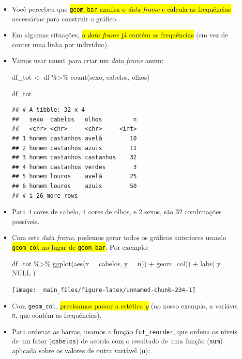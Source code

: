 \documentclass[
  11pt]{report}
\newenvironment{Shaded}{\begin{snugshade}}{\end{snugshade}}
\newcommand{\AttributeTok}[1]{\textcolor[rgb]{0.77,0.63,0.00}{#1}}
\newcommand{\ConstantTok}[1]{\textcolor[rgb]{0.00,0.00,0.00}{#1}}
\newcommand{\FunctionTok}[1]{\textcolor[rgb]{0.00,0.00,0.00}{#1}}
\newcommand{\NormalTok}[1]{#1}
\newcommand{\OtherTok}[1]{\textcolor[rgb]{0.56,0.35,0.01}{#1}}
\newcommand{\SpecialCharTok}[1]{\textcolor[rgb]{0.00,0.00,0.00}{#1}}
\renewenvironment{Shaded}{
    \begin{mdframed}[%
      roundcorner=2pt,%
      innerleftmargin=5pt,%
      innerrightmargin=5pt,%
      topline=true,%
      leftline=true,%
      rightline=true,%
      bottomline=true,%
      linewidth=0.5pt,%
      linecolor=black!20,%
      backgroundcolor=black!2,%
      skipabove=2ex,%
      skipbelow=2.5ex%
    ]%
  }
  {
    \end{mdframed}
  }
\begin{document}
\begin{itemize}
\item
  Você percebeu que {\hl{{\mbox{\texttt{geom\_bar}}} analisa o \emph{data frame} e calcula as frequências}} necessárias para construir o gráfico.
\item
  Em algumas situações, {\hl{o \emph{data frame} já contém as frequências}} (em vez de conter uma linha por indivíduo).
\item
  Vamos usar \texttt{count} para criar um \emph{data frame} assim:

\begin{Shaded}
\begin{Highlighting}[]
\NormalTok{df\_tot }\OtherTok{\textless{}{-}}\NormalTok{ df }\SpecialCharTok{\%\textgreater{}\%} 
  \FunctionTok{count}\NormalTok{(sexo, cabelos, olhos)}

\NormalTok{df\_tot}
\end{Highlighting}
\end{Shaded}

\begin{verbatim}
## # A tibble: 32 x 4
##   sexo  cabelos   olhos         n
##   <chr> <chr>     <chr>     <int>
## 1 homem castanhos avelã        10
## 2 homem castanhos azuis        11
## 3 homem castanhos castanhos    32
## 4 homem castanhos verdes        3
## 5 homem louros    avelã        25
## 6 homem louros    azuis        50
## # i 26 more rows
\end{verbatim}
\item
  Para $4$ cores de cabelo, $4$ cores de olhos, e $2$ sexos, são $32$ combinações possíveis.
\item
  Com este \emph{data frame}, podemos gerar todos os gráficos anteriores usando {\hl{{\mbox{\texttt{geom\_col}}} no lugar de {\mbox{\texttt{geom\_bar}}}}}. Por exemplo:

\begin{Shaded}
\begin{Highlighting}[]
\NormalTok{df\_tot }\SpecialCharTok{\%\textgreater{}\%} 
  \FunctionTok{ggplot}\NormalTok{(}\FunctionTok{aes}\NormalTok{(}\AttributeTok{x =}\NormalTok{ cabelos, }\AttributeTok{y =}\NormalTok{ n)) }\SpecialCharTok{+}
    \FunctionTok{geom\_col}\NormalTok{() }\SpecialCharTok{+}
    \FunctionTok{labs}\NormalTok{(}
      \AttributeTok{y =} \ConstantTok{NULL}
\NormalTok{    )}
\end{Highlighting}
\end{Shaded}

  \begin{center}\texttt{[image: \_main\_files/figure-latex/unnamed-chunk-234-1]} \end{center}
\item
  Com \texttt{geom\_col}, {\hl{precisamos passar a estética $y$}} (no nosso exemplo, a variável \texttt{n}, que contém as frequências).
\item
  Para ordenar as barras, usamos a função \texttt{fct\_reorder}, que ordena os níveis de um fator (\texttt{cabelos}) de acordo com o resultado de uma função (\texttt{sum}) aplicada sobre os valores de outra variável (\texttt{n}):


\end{itemize}
\end{document}
